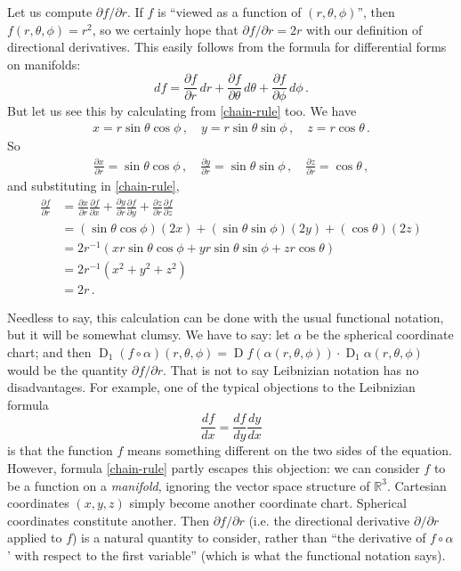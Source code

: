 \documentclass[12pt]{article}
\newcommand{\real}{\mathbb{R}}
\DeclareMathOperator{\D}{D}
\begin{document}
Let us compute $\partial f/ \partial r$.  If $f$ is ``viewed as a function of $(r, \theta, \phi)$'',
then $f(r, \theta, \phi) = r^2$,
so we certainly hope that $\partial f/\partial r = 2r$
with our definition of directional derivatives.
This easily follows from the formula for differential forms on manifolds:
\[
df = \frac{\partial f}{\partial r} \, dr + \frac{\partial f}{\partial \theta} \, d\theta + \frac{\partial f}{\partial \phi} \, d\phi \,.
\]
But let us see this by calculating from \eqref{chain-rule} too.
We have
\begin{align*}
x = r \sin \theta \cos \phi\,, \quad
y = r \sin \theta  \sin \phi \,, \quad
z = r \cos \theta\,.
\end{align*}
So \begin{align*}
\frac{\partial x}{\partial r} = \sin \theta \cos \phi \,, \quad
\frac{\partial y}{\partial r} = \sin \theta \sin \phi \,, \quad
\frac{\partial z}{\partial r} = \cos \theta\,,
\end{align*}
and substituting in \eqref{chain-rule},
\begin{align*}
\frac{\partial f}{\partial r}  
&= 
\frac{\partial x}{\partial r} \frac{\partial f}{\partial x} +
\frac{\partial y}{\partial r} \frac{\partial f}{\partial y} +
\frac{\partial z}{\partial r} \frac{\partial f}{\partial z}
\\
&= (\sin \theta \cos \phi) (2x) +
(\sin \theta \sin \phi) (2y) + (\cos \theta) (2z) \\
&= 2 r^{-1} (xr\sin \theta \cos \phi +
yr\sin \theta \sin \phi + zr\cos \theta) \\
&= 2 r^{-1} (x^2 + y^2 + z^2) \\
&= 2r\,.
\end{align*}

Needless to say, this calculation can be done with the usual functional notation,
but it will be somewhat clumsy. We have to say: let $\alpha$ be the spherical coordinate chart; and then
$\D_1 (f \circ \alpha)(r, \theta, \phi) = \D f(\alpha(r, \theta, \phi)) \cdot \D_1 \alpha(r, \theta, \phi)$
would be the quantity $\partial f / \partial r$.
That is not to say Leibnizian notation has no disadvantages.
For example,
one of the typical objections to the Leibnizian formula
\[
\frac{d f}{dx} = \frac{df}{dy} \frac{dy}{dx}
\]
is that the function $f$ means something different on the two sides of the equation.
However, formula \eqref{chain-rule} partly escapes this objection: 
we can consider $f$ to be a function on a \emph{manifold}, ignoring the vector space structure of $\real^3$.
Cartesian coordinates $(x, y, z)$ simply become another coordinate chart.
Spherical coordinates constitute another.
Then $\partial f / \partial r$ (i.e. the directional derivative $\partial/\partial r$ applied to $f$) is a natural quantity to consider,
rather than ``the derivative of $f \circ \alpha$' with respect to the first variable''
(which is what the functional notation says).
\end{document}
